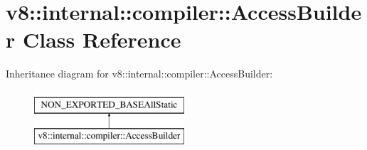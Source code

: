 \hypertarget{classv8_1_1internal_1_1compiler_1_1AccessBuilder}{}\section{v8\+:\+:internal\+:\+:compiler\+:\+:Access\+Builder Class Reference}
\label{classv8_1_1internal_1_1compiler_1_1AccessBuilder}
Inheritance diagram for v8\+:\+:internal\+:\+:compiler\+:\+:Access\+Builder\+:\begin{figure}[H]
\begin{center}
\leavevmode
\includegraphics[height=2.000000cm]{classv8_1_1internal_1_1compiler_1_1AccessBuilder}
\end{center}
\end{figure}
